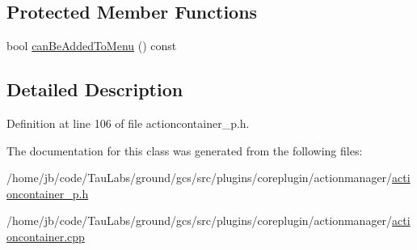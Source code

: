 \subsection*{\-Protected \-Member \-Functions}
\begin{DoxyCompactItemize}
\item 
bool \hyperlink{group___core_plugin_ga8c3e7c1cd1afcdb0653f62666d751955}{can\-Be\-Added\-To\-Menu} () const 
\end{DoxyCompactItemize}


\subsection{\-Detailed \-Description}


\-Definition at line 106 of file actioncontainer\-\_\-p.\-h.



\-The documentation for this class was generated from the following files\-:\begin{DoxyCompactItemize}
\item 
/home/jb/code/\-Tau\-Labs/ground/gcs/src/plugins/coreplugin/actionmanager/\hyperlink{actioncontainer__p_8h}{actioncontainer\-\_\-p.\-h}\item 
/home/jb/code/\-Tau\-Labs/ground/gcs/src/plugins/coreplugin/actionmanager/\hyperlink{actioncontainer_8cpp}{actioncontainer.\-cpp}\end{DoxyCompactItemize}
